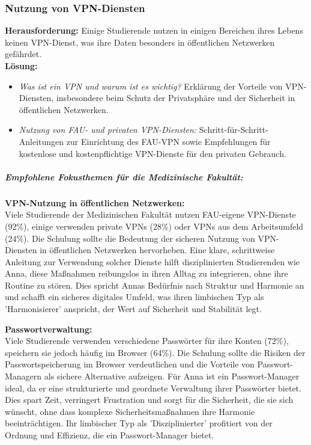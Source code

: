 \documentclass[german,report]{i1thesis}
\begin{document}
\subsubsection{Nutzung von VPN-Diensten}
\textbf{Herausforderung:} Einige Studierende nutzen in einigen Bereichen ihres Lebens keinen VPN-Dienst, was ihre Daten besonders in öffentlichen Netzwerken gefährdet. \\
\textbf{Lösung:}
\begin{itemize}
    \item \textit{Was ist ein VPN und warum ist es wichtig?} Erklärung der Vorteile von VPN-Diensten, insbesondere beim Schutz der Privatsphäre und der Sicherheit in öffentlichen Netzwerken.
    \item \textit{Nutzung von FAU- und privaten VPN-Diensten:} Schritt-für-Schritt-Anleitungen zur Einrichtung des FAU-VPN sowie Empfehlungen für kostenlose und kostenpflichtige VPN-Dienste für den privaten Gebrauch.
\end{itemize}

\subparagraph{Empfohlene Fokusthemen für die Medizinische Fakultät:} 
\mbox{}

\textbf{VPN-Nutzung in öffentlichen Netzwerken:}\\
Viele Studierende der Medizinischen Fakultät nutzen FAU-eigene VPN-Dienste (92\%), einige verwenden private VPNs (28\%) oder VPNs aus dem Arbeitsumfeld (24\%). Die Schulung sollte die Bedeutung der sicheren Nutzung von VPN-Diensten in öffentlichen Netzwerken hervorheben. Eine klare, schrittweise Anleitung zur Verwendung solcher Dienste hilft disziplinierten Studierenden wie Anna, diese Maßnahmen reibungslos in ihren Alltag zu integrieren, ohne ihre Routine zu stören. Dies spricht Annas Bedürfnis nach Struktur und Harmonie an und schafft ein sicheres digitales Umfeld, was ihren limbischen Typ als 'Harmonisierer' anspricht, der Wert auf Sicherheit und Stabilität legt.

\textbf{Passwortverwaltung:}\\
Viele Studierende verwenden verschiedene Passwörter für ihre Konten (72\%), speichern sie jedoch häufig im Browser (64\%). Die Schulung sollte die Risiken der Passwortspeicherung im Browser verdeutlichen und die Vorteile von Passwort-Managern als sichere Alternative aufzeigen. Für Anna ist ein Passwort-Manager ideal, da er eine strukturierte und geordnete Verwaltung ihrer Passwörter bietet. Dies spart Zeit, verringert Frustration und sorgt für die Sicherheit, die sie sich wünscht, ohne dass komplexe Sicherheitsmaßnahmen ihre Harmonie beeinträchtigen. Ihr limbischer Typ als 'Disziplinierter' profitiert von der Ordnung und Effizienz, die ein Passwort-Manager bietet.
\end{document}
